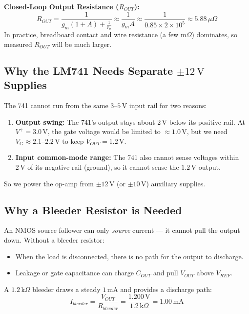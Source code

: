 \documentclass[11pt,a4paper]{article}
\begin{document}
\textbf{Closed-Loop Output Resistance ($R_{OUT}$):}
\begin{equation}
    R_{OUT} = \frac{1}{g_m (1 + A) + \frac{1}{r_o}} \approx \frac{1}{g_m A} \approx \frac{1}{0.85 \times 2 \times 10^5} \approx 5.88\,\mu\Omega
\end{equation}
In practice, breadboard contact and wire resistance (a few m$\Omega$) dominates, so measured $R_{OUT}$ will be much larger.

\subsection{Why the LM741 Needs Separate $\pm 12\,\text{V}$ Supplies}
The 741 cannot run from the same $3\text{--}5\,\text{V}$ input rail for two reasons:
\begin{enumerate}[leftmargin=1.2em, itemsep=0.1em]
    \item \textbf{Output swing:} The 741's output stays about $2\,\text{V}$ below its positive rail. At $V^+ = 3.0\,\text{V}$, the gate voltage would be limited to $\approx 1.0\,\text{V}$, but we need $V_G \approx 2.1\text{--}2.2\,\text{V}$ to keep $V_{OUT} = 1.2\,\text{V}$.
    \item \textbf{Input common-mode range:} The 741 also cannot sense voltages within $2\,\text{V}$ of its negative rail (ground), so it cannot sense the $1.2\,\text{V}$ output.
\end{enumerate}
So we power the op-amp from $\pm 12\,\text{V}$ (or $\pm 10\,\text{V}$) auxiliary supplies.

\subsection{Why a Bleeder Resistor is Needed}
An NMOS source follower can only \textit{source} current --- it cannot pull the output down. Without a bleeder resistor:
\begin{itemize}[leftmargin=1.2em, itemsep=0.1em]
    \item When the load is disconnected, there is no path for the output to discharge.
    \item Leakage or gate capacitance can charge $C_{OUT}$ and pull $V_{OUT}$ above $V_{REF}$.
\end{itemize}
A $1.2\,\text{k}\Omega$ bleeder draws a steady $1\,\text{mA}$ and provides a discharge path:
\begin{equation}
    I_{bleeder} = \frac{V_{OUT}}{R_{bleeder}} = \frac{1.200\,\text{V}}{1.2\,\text{k}\Omega} = 1.00\,\text{mA}
\end{equation}
\end{document}
